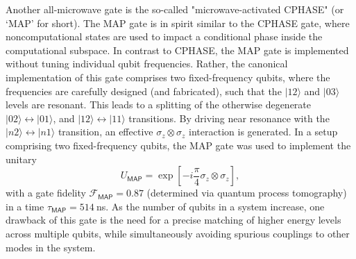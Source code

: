 \documentclass[aip,apr,twocolumn,showpacs,superscriptaddress,groupedaddress,nofootinbib,reprint]{revtex4-1}  %
\newcommand{\CPHASE}{\textsf{CPHASE}}
\begin{document}
Another all-microwave gate is the so-called "microwave-activated \CPHASE{}" (or `\textsf{MAP}' for short)\cite{Chow2013}. The \textsf{MAP} gate is in spirit similar to the \CPHASE{} gate, where noncomputational states are used to impact a conditional phase inside the computational subspace. In contrast to \CPHASE{}, the \textsf{MAP} gate is implemented without tuning individual qubit frequencies. Rather, the canonical implementation of this gate comprises two fixed-frequency qubits, where the frequencies are carefully designed (and fabricated), such that the $|12\rangle$ and $|03\rangle$ levels are resonant. This leads to a splitting of the otherwise degenerate $|02\rangle\leftrightarrow|01\rangle$, and $|12\rangle \leftrightarrow |11\rangle$ transitions. By driving near resonance with the $|n2\rangle\leftrightarrow |n1\rangle$ transition, an effective $\sigma_z\otimes \sigma_z$ interaction is generated. In a setup comprising two fixed-frequency qubits, the \textsf{MAP} gate was used to implement the unitary
\begin{equation}
U_\textsf{MAP} = \exp\left[-i\frac{\pi}{4}\sigma_z\otimes \sigma_z\right],
\end{equation}
with a gate fidelity $\mathcal F_\textsf{MAP} = 0.87$ (determined via quantum process tomography) in a time $\tau_\textsf{MAP} = 514~$ns\cite{Chow2013}. As the number of qubits in a system increase, one drawback of this gate is the need for a precise matching of higher energy levels across multiple qubits, while simultaneously avoiding spurious couplings to other modes in the system.
\end{document}
